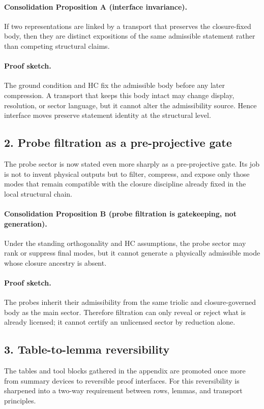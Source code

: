 \paragraph{Consolidation Proposition A (interface invariance).}
If two representations are linked by a transport that preserves the closure-fixed
body, then they are distinct expositions of the same admissible statement rather
than competing structural claims.

\paragraph{Proof sketch.}
The ground condition and HC fix the admissible body before any later compression.
A transport that keeps this body intact may change display, resolution, or
sector language, but it cannot alter the admissibility source. Hence interface
moves preserve statement identity at the structural level.

\subsection*{2. Probe filtration as a pre-projective gate}
The probe sector is now stated even more sharply as a pre-projective gate. Its
job is not to invent physical outputs but to filter, compress, and expose only
those modes that remain compatible with the closure discipline already fixed in
the local structural chain.

\paragraph{Consolidation Proposition B (probe filtration is gatekeeping, not generation).}
Under the standing orthogonality and HC assumptions, the probe sector may rank or
suppress final modes, but it cannot generate a physically admissible mode
whose closure ancestry is absent.

\paragraph{Proof sketch.}
The probes inherit their admissibility from the same triolic and closure-governed
body as the main sector. Therefore filtration can only reveal or reject what is
already licensed; it cannot certify an unlicensed sector by reduction alone.

\subsection*{3. Table-to-lemma reversibility}
The tables and tool blocks gathered in the appendix are promoted once more from
summary devices to reversible proof interfaces. For  this reversibility
is sharpened into a two-way requirement between rows, lemmas, and transport
principles.

